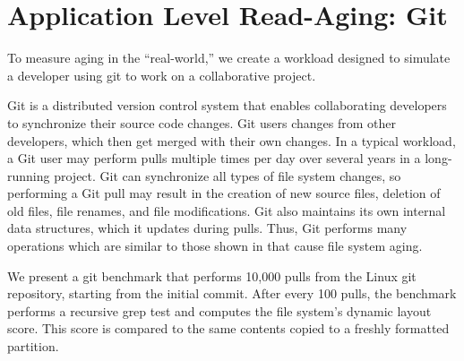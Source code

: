 \section{Application Level Read-Aging: Git}\label{sec:fsa-git}

To measure aging in the ``real-world,'' we create a workload designed to
simulate a developer using git to work on a collaborative project.

Git is a distributed version control system that enables collaborating
developers to synchronize their source code changes.  Git users 
changes from other developers, which then get merged with their own changes.
In a typical workload, a Git user may perform pulls multiple times per day over
several years in a long-running project.  Git can synchronize all types of file
system changes, so performing a Git pull may result in the creation of new
source files, deletion of old files, file renames, and file modifications.  Git
also maintains its own internal data structures, which it updates during pulls.
Thus, Git performs many operations which are similar to those shown in
 that cause file system aging.

We present a git benchmark that performs 10,000 pulls from the Linux git repository, starting
from the initial commit. After every 100 pulls, the benchmark performs a recursive grep
test and computes the file system's dynamic layout score.
This score is compared to the same contents copied to a freshly formatted partition.



